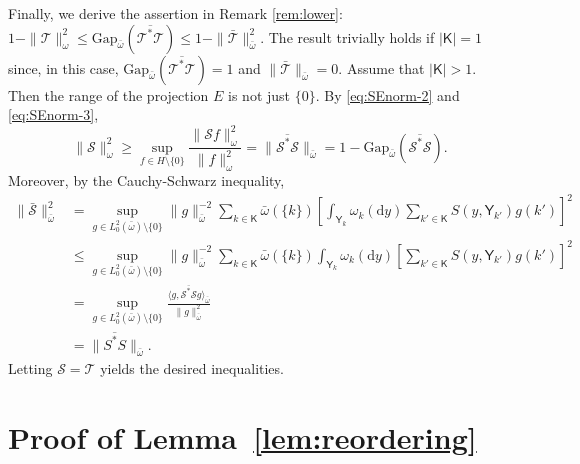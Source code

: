 \documentclass[12pt]{article}
\newcommand{\df}{\mathrm{d}}
\newcommand{\Y}{\mathsf{Y}}
\newcommand{\Mtk}{\mtkfont{T}}
\newcommand{\mtkfont}{\mathcal}
\begin{document}
{
	Finally, we derive the assertion in Remark \ref{rem:lower}:
	$
	1 - \|\Mtk\|_{\omega}^2 \leq \mbox{Gap}_{\bar{\omega}}(\overline{\Mtk^* \Mtk}) \leq 1 - \|\bar{\mtkfont{T}}\|_{\bar{\omega}}^2.
	$
	The result trivially holds if $|\mathsf{K}| = 1$ since, in this case, $ \mbox{Gap}_{\bar{\omega}}(\overline{\Mtk^* \Mtk}) =  1$ and $\|\bar{\Mtk}\|_{\bar{\omega}} = 0$.
	Assume that $|\mathsf{K}| > 1$.
	Then the range of the projection $E$ is not just $\{0\}$.
	By \eqref{eq:SEnorm-2} and \eqref{eq:SEnorm-3},
	\[
	\|\mtkfont{S}\|_{\omega}^2 \geq \sup_{f \in H \setminus \{0\}} \frac{\|\mtkfont{S} f\|_{\omega}^2}{\|f\|_{\omega}^2} = \|\overline{\mtkfont{S}^* \mtkfont{S}}\|_{\bar{\omega}} = 1 - \mbox{Gap}_{\bar{\omega}} ( \overline{\mtkfont{S}^* \mtkfont{S}} ).
	\]
	Moreover, by the Cauchy-Schwarz inequality,
	\[
	\begin{aligned}
		\|\bar{\mtkfont{S}}\|_{\bar{\omega}}^2 &= \sup_{g \in L_0^2(\bar{\omega})  \setminus \{0\}} \|g\|_{\bar{\omega}}^{-2} \sum_{k \in \mathsf{K}} \bar{\omega}(\{k\}) \left[  \int_{\Y_k} \omega_k(\df y) \sum_{k' \in \mathsf{K}} S(y, \Y_{k'}) g(k') \right]^2 \\
		&\leq \sup_{g \in L_0^2(\bar{\omega}) \setminus \{0\}} \|g\|_{\bar{\omega}}^{-2} \sum_{k \in \mathsf{K}} \bar{\omega}(\{k\})   \int_{\Y_k} \omega_k(\df y) \left[ \sum_{k' \in \mathsf{K}} S(y, \Y_{k'}) g(k') \right]^2 \\
		&= \sup_{g \in L_0^2(\bar{\omega}) \setminus \{0\}} \frac{ \langle g, \overline{\mtkfont{S}^*\mtkfont{S}} g \rangle_{\bar{\omega}} }{\|g\|_{\bar{\omega}}^2} \\
		&= \|\overline{S^*S}\|_{\bar{\omega}}.
	\end{aligned}
	\]
	Letting $\mtkfont{S} = \Mtk$ yields the desired inequalities.
}







{
	\section{Proof of Lemma~\ref{lem:reordering}} \label{app:reordering-invariant}
}
\end{document}
